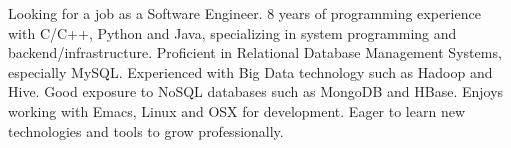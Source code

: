 

\begin{cvparagraph}

Looking for a job as a Software
Engineer. 8 years of programming experience with C/C++, Python and
Java, specializing in system programming and
backend/infrastructure. Proficient in Relational Database Management
Systems, especially MySQL. Experienced with Big Data technology such
as Hadoop and Hive. Good exposure to NoSQL databases such as MongoDB
and HBase. Enjoys working with Emacs, Linux and OSX for
development. Eager to learn new technologies and tools to grow
professionally.
\end{cvparagraph}
